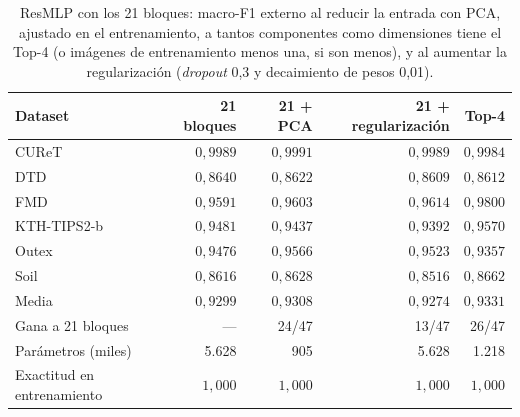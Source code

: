 \begin{table}[H]
\centering\fontsize{8}{10}\selectfont\setlength{\tabcolsep}{3.0pt}
\caption{ResMLP con los 21 bloques: macro-F1 externo al reducir la entrada con PCA, ajustado en el entrenamiento, a tantos componentes como dimensiones tiene el Top-4 (o imágenes de entrenamiento menos una, si son menos), y al aumentar la regularización (\emph{dropout} 0,3 y decaimiento de pesos 0,01).}
\label{tab:sel-capacity}
\begin{tabular}{@{}lrrrr@{}}
\toprule
Dataset & 21 bloques & 21 + PCA & 21 + regularización & Top-4 \\
\midrule
CUReT & $0{,}9989$ & $0{,}9991$ & $0{,}9989$ & $0{,}9984$ \\
DTD & $0{,}8640$ & $0{,}8622$ & $0{,}8609$ & $0{,}8612$ \\
FMD & $0{,}9591$ & $0{,}9603$ & $0{,}9614$ & $0{,}9800$ \\
KTH-TIPS2-b & $0{,}9481$ & $0{,}9437$ & $0{,}9392$ & $0{,}9570$ \\
Outex & $0{,}9476$ & $0{,}9566$ & $0{,}9523$ & $0{,}9357$ \\
Soil & $0{,}8616$ & $0{,}8628$ & $0{,}8516$ & $0{,}8662$ \\
\midrule
Media & $0{,}9299$ & $0{,}9308$ & $0{,}9274$ & $0{,}9331$ \\
Gana a 21 bloques & --- & 24/47 & 13/47 & 26/47 \\
Parámetros (miles) & 5.628 & 905 & 5.628 & 1.218 \\
Exactitud en entrenamiento & $1{,}000$ & $1{,}000$ & $1{,}000$ & $1{,}000$ \\
\bottomrule
\end{tabular}
\end{table}
